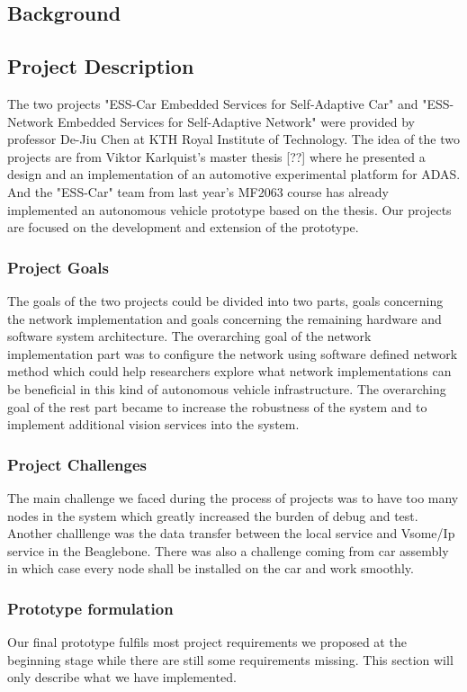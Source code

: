 \documentclass[11pt, titlepage]{article} %
\begin{document}
\subsection{Background}

\subsection{Project Description}
The two projects "ESS-Car Embedded Services for Self-Adaptive Car" and "ESS-Network Embedded Services for Self-Adaptive Network" were provided by professor De-Jiu Chen at KTH Royal Institute of Technology. The idea of the two projects are from Viktor Karlquist's master thesis [??] where he presented a design and an implementation of an automotive experimental platform for ADAS. And the "ESS-Car" team from last year's MF2063 course has already implemented an autonomous vehicle prototype based on the thesis. Our projects are focused on the development and extension of the prototype.

\subsubsection{Project Goals}
The goals of the two projects could be divided into two parts, goals concerning the network implementation and goals concerning the remaining hardware and software system architecture.
The overarching goal of the network implementation part was to configure the network using software defined network method which could help researchers explore what network implementations can be beneficial in this kind of autonomous vehicle infrastructure. The overarching goal of the rest part became to increase the robustness of the system and to implement additional vision services into the system.

\subsubsection{Project Challenges}
The main challenge we faced during the process of projects was to have too many nodes in the system which greatly increased the burden of debug and test. Another challlenge was the data transfer between the local service and Vsome/Ip service in the Beaglebone. There was also a challenge coming from car assembly in which case every node shall be installed on the car and work smoothly. 

\subsubsection{Prototype formulation}
Our final prototype fulfils most project requirements we proposed at the beginning stage while there are still some requirements missing. This section will only describe what we have implemented.
\end{document}
